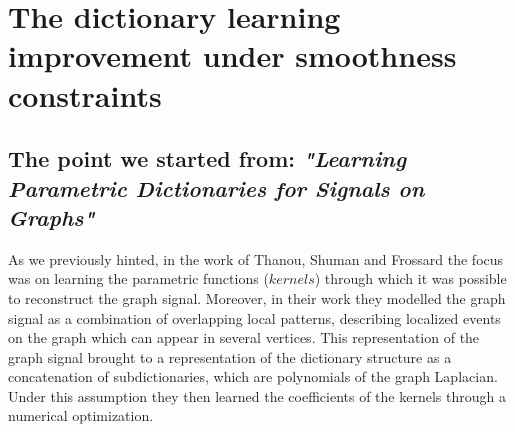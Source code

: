 \chapter{The dictionary learning improvement under smoothness constraints}
\label{sec:DL}
\section{The point we started from: \textit{"Learning Parametric Dictionaries for Signals on Graphs"}}
As we previously hinted, in the work of Thanou, Shuman and Frossard the focus was on learning the parametric functions ($kernels$) through which it was possible to reconstruct the graph signal. Moreover, in their work they modelled the graph signal as a combination of overlapping local patterns, describing localized events on the graph which can appear in several vertices. This representation of the graph signal brought to a representation of the dictionary structure as a concatenation of subdictionaries, which are polynomials of the graph Laplacian. Under this assumption they then learned the coefficients of the kernels through a numerical optimization.

